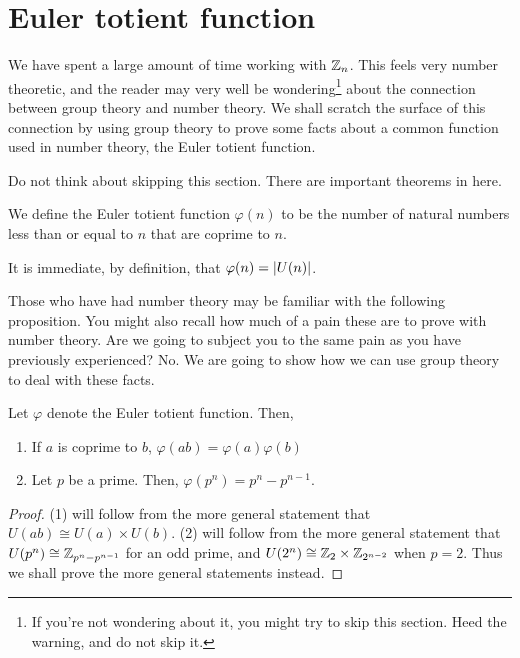 \documentclass[./main.tex]{subfiles}
\begin{document}
\section{Euler totient function}
We have spent a large amount of time working with $\mathbb{Z}_n$. This feels very
number theoretic, and the reader may very well be wondering\footnote{If you're
not wondering about it, you might try to skip this section. Heed the warning,
and do not skip it.} about the connection between group theory and number
theory. We shall scratch the surface of this connection by using group theory to
prove some facts about a common function used in number theory, the Euler
totient function.
\begin{warning}
Do not think about skipping this section. There are important theorems in here.
\end{warning}
\begin{definition}
    We define the Euler totient function $\varphi(n)$ to be the number of
    natural numbers less than or equal to $n$ that are coprime to $n$.
\end{definition}
It is immediate, by definition, that $\varphi(n) = \abs{U(n)}$. 

Those who have had number theory may be familiar with the following proposition.
You might also recall how much of a pain these are to prove with number theory.
Are we going to subject you to the same pain as you have previously experienced? 
No. We are going to show how we can use group theory to deal with these facts.
\begin{proposition}
    Let $\varphi$ denote the Euler totient function. Then, 

    \begin{enumerate}
        \item If $a$ is coprime to $b$, $\varphi(ab) = \varphi(a) \varphi(b)$
        \item Let $p$ be a prime. Then, $\varphi(p^n) = p^n - p^{n-1}$.
    \end{enumerate}
\end{proposition}
\begin{proof}
    (1) will follow from the more general statement that $U(ab) \cong U(a)
    \times U(b)$. (2) will follow from the more general statement that $U(p^n)
    \cong \mathbb{Z}_{p^n - p^{n-1}}$ for an odd prime, and $U(2^n) \cong \mathbb{Z}_2 \times
    \mathbb{Z}_{2^{n-2}}$ when $p=2$. Thus we shall prove the more general statements
    instead.
\end{proof}
\end{document}
